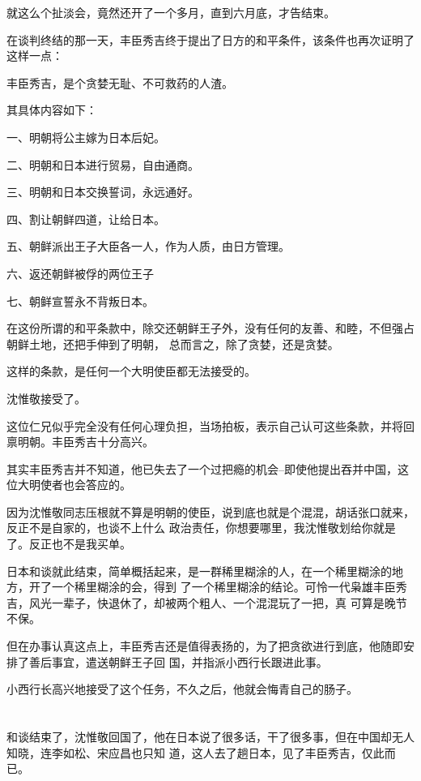 \documentclass[11pt,a4paper,onecolumn]{article}
\begin{document}
就这么个扯淡会，竟然还开了一个多月，直到六月底，才告结束。

在谈判终结的那一天，丰臣秀吉终于提出了日方的和平条件，该条件也再次证明了这样一点：

丰臣秀吉，是个贪婪无耻、不可救药的人渣。

其具体内容如下：

一、明朝将公主嫁为日本后妃。

二、明朝和日本进行贸易，自由通商。

三、明朝和日本交换誓词，永远通好。

四、割让朝鲜四道，让给日本。

五、朝鲜派出王子大臣各一人，作为人质，由日方管理。

六、返还朝鲜被俘的两位王子

七、朝鲜宣誓永不背叛日本。

在这份所谓的和平条款中，除交还朝鲜王子外，没有任何的友善、和睦，不但强占朝鲜土地，还把手伸到了明朝，
总而言之，除了贪婪，还是贪婪。

这样的条款，是任何一个大明使臣都无法接受的。

沈惟敬接受了。

这位仁兄似乎完全没有任何心理负担，当场拍板，表示自己认可这些条款，并将回禀明朝。丰臣秀吉十分高兴。

其实丰臣秀吉并不知道，他已失去了一个过把瘾的机会--即使他提出吞并中国，这位大明使者也会答应的。

因为沈惟敬同志压根就不算是明朝的使臣，说到底也就是个混混，胡话张口就来，反正不是自家的，也谈不上什么
政治责任，你想要哪里，我沈惟敬划给你就是了。反正也不是我买单。

日本和谈就此结束，简单概括起来，是一群稀里糊涂的人，在一个稀里糊涂的地方，开了一个稀里糊涂的会，得到
了一个稀里糊涂的结论。可怜一代枭雄丰臣秀吉，风光一辈子，快退休了，却被两个粗人、一个混混玩了一把，真
可算是晚节不保。

但在办事认真这点上，丰臣秀吉还是值得表扬的，为了把贪欲进行到底，他随即安排了善后事宜，遣送朝鲜王子回
国，并指派小西行长跟进此事。

小西行长高兴地接受了这个任务，不久之后，他就会悔青自己的肠子。

\section[\thesection]{}

和谈结束了，沈惟敬回国了，他在日本说了很多话，干了很多事，但在中国却无人知晓，连李如松、宋应昌也只知
道，这人去了趟日本，见了丰臣秀吉，仅此而已。
\end{document}

